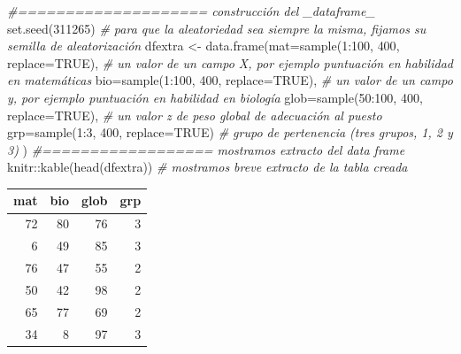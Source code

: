 \documentclass[
]{book}
\newenvironment{Shaded}{\begin{snugshade}}{\end{snugshade}}
\newcommand{\AttributeTok}[1]{\textcolor[rgb]{0.77,0.63,0.00}{#1}}
\newcommand{\CommentTok}[1]{\textcolor[rgb]{0.56,0.35,0.01}{\textit{#1}}}
\newcommand{\ConstantTok}[1]{\textcolor[rgb]{0.00,0.00,0.00}{#1}}
\newcommand{\DecValTok}[1]{\textcolor[rgb]{0.00,0.00,0.81}{#1}}
\newcommand{\FunctionTok}[1]{\textcolor[rgb]{0.00,0.00,0.00}{#1}}
\newcommand{\NormalTok}[1]{#1}
\newcommand{\OtherTok}[1]{\textcolor[rgb]{0.56,0.35,0.01}{#1}}
\newcommand{\SpecialCharTok}[1]{\textcolor[rgb]{0.00,0.00,0.00}{#1}}
\begin{document}
\begin{Shaded}
\begin{Highlighting}[]
\CommentTok{\#==================== construcción del \_dataframe\_}
\FunctionTok{set.seed}\NormalTok{(}\DecValTok{311265}\NormalTok{) }\CommentTok{\# para que la aleatoriedad sea siempre la misma, fijamos su semilla de aleatorización}
\NormalTok{dfextra }\OtherTok{\textless{}{-}} \FunctionTok{data.frame}\NormalTok{(}\AttributeTok{mat=}\FunctionTok{sample}\NormalTok{(}\DecValTok{1}\SpecialCharTok{:}\DecValTok{100}\NormalTok{, }\DecValTok{400}\NormalTok{, }\AttributeTok{replace=}\ConstantTok{TRUE}\NormalTok{), }\CommentTok{\# un valor de un campo X, por ejemplo puntuación en habilidad en matemáticas}
                      \AttributeTok{bio=}\FunctionTok{sample}\NormalTok{(}\DecValTok{1}\SpecialCharTok{:}\DecValTok{100}\NormalTok{, }\DecValTok{400}\NormalTok{, }\AttributeTok{replace=}\ConstantTok{TRUE}\NormalTok{), }\CommentTok{\# un valor de un campo y, por ejemplo puntuación en habilidad en biología}
                      \AttributeTok{glob=}\FunctionTok{sample}\NormalTok{(}\DecValTok{50}\SpecialCharTok{:}\DecValTok{100}\NormalTok{, }\DecValTok{400}\NormalTok{, }\AttributeTok{replace=}\ConstantTok{TRUE}\NormalTok{), }\CommentTok{\# un valor z de peso global de adecuación al puesto}
                      \AttributeTok{grp=}\FunctionTok{sample}\NormalTok{(}\DecValTok{1}\SpecialCharTok{:}\DecValTok{3}\NormalTok{, }\DecValTok{400}\NormalTok{, }\AttributeTok{replace=}\ConstantTok{TRUE}\NormalTok{) }\CommentTok{\# grupo de pertenencia (tres grupos, 1, 2 y 3)}
\NormalTok{                      ) }
\CommentTok{\#================== mostramos extracto del data frame}
\NormalTok{knitr}\SpecialCharTok{::}\FunctionTok{kable}\NormalTok{(}\FunctionTok{head}\NormalTok{(dfextra)) }\CommentTok{\# mostramos breve extracto de la tabla creada}
\end{Highlighting}
\end{Shaded}

\begin{tabular}{r|r|r|r}
\hline
mat & bio & glob & grp\\
\hline
72 & 80 & 76 & 3\\
\hline
6 & 49 & 85 & 3\\
\hline
76 & 47 & 55 & 2\\
\hline
50 & 42 & 98 & 2\\
\hline
65 & 77 & 69 & 2\\
\hline
34 & 8 & 97 & 3\\
\hline
\end{tabular}
\end{document}
